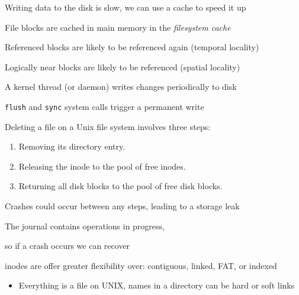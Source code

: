   \begin{slide}
    

    Writing data to the disk is slow, we can use a cache to speed it up
    \medskip

    File blocks are cached in main memory in the \textit{filesystem cache}
    
    \leftspace{}Referenced blocks are likely to be referenced again (temporal locality)

    \leftspace{}Logically near blocks are likely to be referenced (spatial locality)
    \medskip

    A kernel thread (or daemon) writes changes periodically to disk
    \medskip
    
    \texttt{flush} and \texttt{sync} system calls trigger a permanent write

  \end{slide}

  \begin{slide}
    

    Deleting a file on a Unix file system involves three steps:

    \begin{enumerate}
      \item Removing its directory entry.
      \item Releasing the inode to the pool of free inodes.
      \item Returning all disk blocks to the pool of free disk blocks.
    \end{enumerate}
    \medskip

    Crashes could occur between any steps, leading to a storage leak
    \medskip

    The journal contains operations in progress,
    
    \leftspace{}so if a crash occurs we can recover

  \end{slide}

  \begin{slide}
    
    
    inodes are offer greater flexibility over: contiguous, linked, FAT, or
    indexed

    \begin{itemize}
      \item Everything is a file on UNIX, names in a directory can be hard or
            soft links
    \end{itemize}

  \end{slide}


